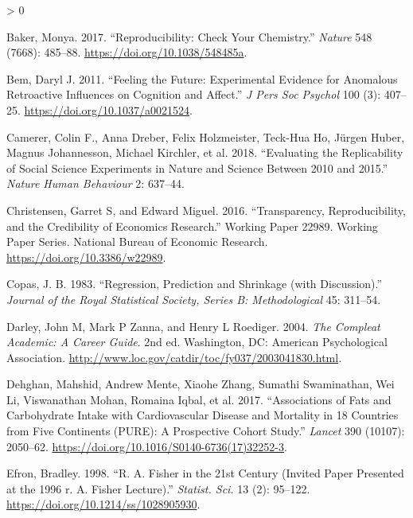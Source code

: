 \documentclass[
  12pt,
]{book}
\newlength{\cslhangindent}
\newenvironment{CSLReferences}[2] %
 {%
  \setlength{\parindent}{0pt}
  \ifodd #1 \everypar{\setlength{\hangindent}{\cslhangindent}}\ignorespaces\fi
  \ifnum #2 > 0
  \setlength{\parskip}{#2\baselineskip}
  \fi
 }%
 {}
\theoremstyle{definition}
\theoremstyle{definition}
\theoremstyle{definition}
\theoremstyle{remark}
\begin{document}
\hypertarget{refs}{}
\begin{CSLReferences}{1}{0}
\leavevmode\hypertarget{ref-bake:2017}{}%
Baker, Monya. 2017. {``Reproducibility: Check Your Chemistry.''} \emph{Nature} 548 (7668): 485--88. \url{https://doi.org/10.1038/548485a}.

\leavevmode\hypertarget{ref-bem:2011}{}%
Bem, Daryl J. 2011. {``Feeling the Future: Experimental Evidence for Anomalous Retroactive Influences on Cognition and Affect.''} \emph{J Pers Soc Psychol} 100 (3): 407--25. \url{https://doi.org/10.1037/a0021524}.

\leavevmode\hypertarget{ref-Camerer2018EvaluatingTR}{}%
Camerer, Colin F., Anna Dreber, Felix Holzmeister, Teck-Hua Ho, Jürgen Huber, Magnus Johannesson, Michael Kirchler, et al. 2018. {``Evaluating the Replicability of Social Science Experiments in Nature and Science Between 2010 and 2015.''} \emph{Nature Human Behaviour} 2: 637--44.

\leavevmode\hypertarget{ref-NBERw22989}{}%
Christensen, Garret S, and Edward Miguel. 2016. {``Transparency, Reproducibility, and the Credibility of Economics Research.''} Working Paper 22989. Working Paper Series. National Bureau of Economic Research. \url{https://doi.org/10.3386/w22989}.

\leavevmode\hypertarget{ref-copa:1983}{}%
Copas, J. B. 1983. {``Regression, Prediction and Shrinkage (with Discussion).''} \emph{Journal of the Royal Statistical Society, Series B: Methodological} 45: 311--54.

\leavevmode\hypertarget{ref-darl:zann:roed:2004}{}%
Darley, John M, Mark P Zanna, and Henry L Roediger. 2004. \emph{The Compleat Academic: A Career Guide}. 2nd ed. Washington, DC: American Psychological Association. \url{http://www.loc.gov/catdir/toc/fy037/2003041830.html}.

\leavevmode\hypertarget{ref-dehg:ment:zhan:2017}{}%
Dehghan, Mahshid, Andrew Mente, Xiaohe Zhang, Sumathi Swaminathan, Wei Li, Viswanathan Mohan, Romaina Iqbal, et al. 2017. {``Associations of Fats and Carbohydrate Intake with Cardiovascular Disease and Mortality in 18 Countries from Five Continents (PURE): A Prospective Cohort Study.''} \emph{Lancet} 390 (10107): 2050--62. \url{https://doi.org/10.1016/S0140-6736(17)32252-3}.

\leavevmode\hypertarget{ref-efron1998}{}%
Efron, Bradley. 1998. {``R. A. Fisher in the 21st Century (Invited Paper Presented at the 1996 r. A. Fisher Lecture).''} \emph{Statist. Sci.} 13 (2): 95--122. \url{https://doi.org/10.1214/ss/1028905930}.


\end{CSLReferences}
\end{document}
